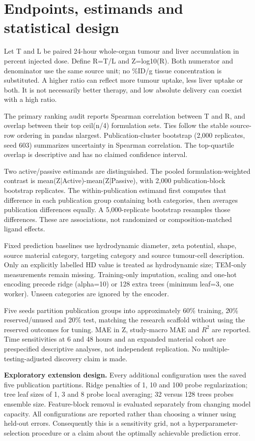 \documentclass[11pt]{article}
\begin{document}
\section{Endpoints, estimands and statistical design}
Let T and L be paired 24-hour whole-organ tumour and liver accumulation in percent injected dose. Define R=T/L and Z=log10(R). Both numerator and denominator use the same source unit; no \%ID/g tissue concentration is substituted. A higher ratio can reflect more tumour uptake, less liver uptake or both. It is not necessarily better therapy, and low absolute delivery can coexist with a high ratio.

The primary ranking audit reports Spearman correlation between T and R, and overlap between their top ceil(n/4) formulation sets. Ties follow the stable source-row ordering in pandas nlargest. Publication-cluster bootstrap (2,000 replicates, seed 603) summarizes uncertainty in Spearman correlation. The top-quartile overlap is descriptive and has no claimed confidence interval.

Two active/passive estimands are distinguished. The pooled formulation-weighted contrast is mean(Z|Active)-mean(Z|Passive), with 2,000 publication-block bootstrap replicates. The within-publication estimand first computes that difference in each publication group containing both categories, then averages publication differences equally. A 5,000-replicate bootstrap resamples those differences. These are associations, not randomized or composition-matched ligand effects.

Fixed prediction baselines use hydrodynamic diameter, zeta potential, shape, source material category, targeting category and source tumour-cell description. Only an explicitly labelled HD value is treated as hydrodynamic size; TEM-only measurements remain missing. Training-only imputation, scaling and one-hot encoding precede ridge (alpha=10) or 128 extra trees (minimum leaf=3, one worker). Unseen categories are ignored by the encoder.

Five seeds partition publication groups into approximately 60\% training, 20\% reserved/unused and 20\% test, matching the research scaffold without using the reserved outcomes for tuning. MAE in Z, study-macro MAE and \(R^2\) are reported. Time sensitivities at 6 and 48 hours and an expanded material cohort are prespecified descriptive analyses, not independent replication. No multiple-testing-adjusted discovery claim is made.

\textbf{Exploratory extension design.} Every additional configuration uses the saved five publication partitions. Ridge penalties of 1, 10 and 100 probe regularization; tree leaf sizes of 1, 3 and 8 probe local averaging; 32 versus 128 trees probes ensemble size. Feature-block removal is evaluated separately from changing model capacity. All configurations are reported rather than choosing a winner using held-out errors. Consequently this is a sensitivity grid, not a hyperparameter-selection procedure or a claim about the optimally achievable prediction error.
\end{document}
